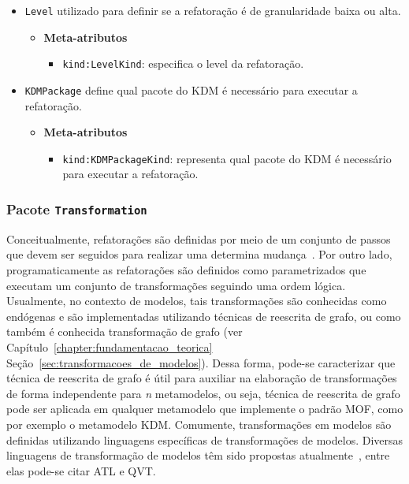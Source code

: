 \begin{itemize}
\item \texttt{Level} utilizado para definir se a refatoração é de granularidade baixa ou alta.

\begin{itemize}
	\item \textbf{Meta-atributos}
		\begin{itemize}
			\item \texttt{kind:LevelKind}: especifica o level da refatoração.
		\end{itemize}	
\end{itemize} 

\item \texttt{KDMPackage} define qual pacote do KDM é necessário para executar a refatoração.

\begin{itemize}
	\item \textbf{Meta-atributos}
		\begin{itemize}
			\item \texttt{kind:KDMPackageKind}: representa qual pacote do KDM é necessário para executar a refatoração.
		\end{itemize}	
\end{itemize} 

\end{itemize}

\subsubsection{Pacote \texttt{Transformation}}

Conceitualmente, refatorações são definidas por meio de um conjunto de passos que devem ser seguidos para realizar uma determina mudança~\cite{Fowler1999, Demeyer1}. Por outro lado, programaticamente as refatorações são definidos como  parametrizados que executam um conjunto de transformações seguindo uma ordem lógica. Usualmente, no contexto de modelos, tais transformações são conhecidas como endógenas e são implementadas utilizando técnicas de reescrita de grafo, ou como também é conhecida transformação de grafo (ver Capítulo~\ref{chapter:fundamentacao_teorica} Seção~\ref{sec:transformacoes_de_modelos}). Dessa forma, pode-se caracterizar que técnica de reescrita de grafo é útil para auxiliar na elaboração de transformações de forma independente para \textit{n} metamodelos, ou seja, técnica de reescrita de grafo pode ser aplicada em qualquer metamodelo que implemente o padrão MOF, como por exemplo o metamodelo KDM. Comumente, transformações em modelos são definidas utilizando linguagens específicas de transformações de modelos. Diversas linguagens de transformação de modelos têm sido propostas atualmente~\cite{Biehl_2010, Allilaire_06}, entre elas pode-se citar ATL e QVT.

